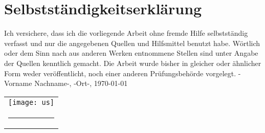 
\section{Selbstständigkeitserklärung}

Ich versichere, dass ich die vorliegende Arbeit ohne fremde Hilfe
selbstständig verfasst und nur die angegebenen Quellen und
Hilfsmittel benutzt habe. Wörtlich oder dem Sinn nach aus anderen
Werken entnommene Stellen sind unter Angabe der Quellen kenntlich
gemacht. Die Arbeit wurde bisher in gleicher oder ähnlicher Form
weder veröffentlicht, noch einer anderen Prüfungsbehörde vorgelegt.
\vfill
-Vorname Nachname-, -Ort-, \today \hfill 
\begin{tabular}{l}
\texttt{[image: us]}\\
\rule{120pt}{1pt}\\
\end{tabular}



